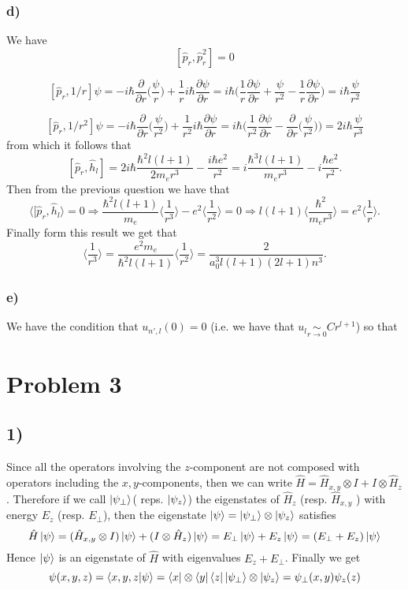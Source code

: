 \documentclass[10pt,a4paper]{book}
\newcommand{\p}{\partial}
\begin{document}
\subsubsection*{d)}
We have
$$[\hat{p}_r,\hat{p}_r^2]=0
$$

$$[\hat{p}_r,1/r]\psi=-i\hbar \frac{\p}{\p r}\bigg(\frac{\psi}{r}\bigg)+\frac{1}{r}i\hbar\frac{\p \psi}{\p r}=i\hbar\bigg(\frac{1}{r}\frac{\p\psi}{\p r}+\frac{\psi}{r^2}-\frac{1}{r}\frac{\p\psi}{\p r}\bigg)=i\hbar\frac{\psi}{r^2}$$

$$[\hat{p}_r,1/r^2]\psi=-i\hbar \frac{\p}{\p r}\bigg(\frac{\psi}{r^2}\bigg)+\frac{1}{r^2}i\hbar\frac{\p \psi}{\p r}=i\hbar\bigg(\frac{1}{r^2}\frac{\p\psi}{\p r}-\frac{\p}{\p r}\bigg(\frac{\psi}{r^2}\bigg)\bigg)=2i\hbar\frac{\psi}{r^3}$$
from which it follows that 
$$[\hat{p}_r,\hat{h}_l]=2i\hbar\frac{\hbar^2l(l+1)}{2m_er^3}-\frac{i\hbar e^2}{r^2}=i\frac{\hbar^3l(l+1)}{m_er^3}-i\frac{\hbar e^2}{r^2}.$$
Then from the previous question we have that 
$$\langle [\hat{p}_r,\hat{h}_l\rangle=0\Rightarrow\frac{\hbar^2l(l+1)}{m_e}\bigg\langle\frac{1}{r^3}\bigg\rangle-e^2\bigg\langle\frac{1}{r^2}\bigg\rangle=0\Rightarrow l(l+1)\bigg\langle \frac{\hbar^2}{m_er^3}\bigg\rangle=e^2\bigg\langle\frac{1}{r}\bigg\rangle.$$
Finally form this result we get that 
$$\bigg\langle\frac{1}{r^3}\bigg\rangle =\frac{e^2m_e}{\hbar^2l(l+1)}\bigg\langle\frac{1}{r^2}\bigg\rangle=\frac{2}{a_0^3l(l+1)(2l+1)n^3}.$$

\subsubsection*{e)}
We have the condition that $u_{n',l}(0)=0$ (i.e. we have that $u_l\underset{r\to0}{\sim}Cr^{l+1}$) so that 


\section*{Problem 3}


\subsection*{1)}

Since all the operators involving the $z$-component are not composed with operators including the $x,y$-components, then we can write $\hat{H}=\hat{H}_{x,y}\otimes I+I\otimes\hat{H}_z$. Therefore if we call $\ket{\psi_{\perp}}$( reps. $\ket{\psi_z}$) the eigenstates of $\hat{H}_z$ (resp. $\hat{H}_{x,y}$ ) with energy $E_z$ (resp. $E_{\perp}$), then the eigenstate $\ket{\psi}=\ket{\psi_{\perp}}\otimes\ket{\psi_z}$ satisfies
$$\hat{H}\ket{\psi}=(\hat{H}_{x,y}\otimes I)\ket{\psi}+(I\otimes\hat{H}_z)\ket{\psi}=E_{\perp}\ket{\psi}+E_z\ket{\psi}=(E_{\perp}+E_{z})\ket{\psi}$$
Hence $\ket{\psi}$ is an eigenstate of $\hat{H}$ with eigenvalues $E_z+E_{\perp}$. 
Finally we get 
$$\psi(x,y,z)=\braket{x,y,z|\psi}=\bra{x}\otimes\bra{y}\bra{z}\ket{\psi_{\perp}}\otimes\ket{\psi_z}=\psi_{\perp}(x,y)\psi_z(z)$$
\end{document}
